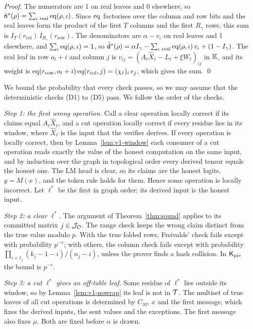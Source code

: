 \noindent\emph{Proof.} The numerators are 1 on real leaves and 0 elsewhere, so $\tilde{\mathsf
n}^\ast(\rho) = \sum_{\iota \text{ real}} \mathrm{eq}(\rho, \iota)$. Since $\mathrm{eq}$ factorises over the
column and row bits and the real leaves form the product of the first $T$ columns and the first
$R_\gamma$ rows, this sum is $I_T(r_{\mathrm{col}})\, I_{R_\gamma}(r_{\mathrm{row}})$. The
denominators are $\alpha - v_\iota$ on real leaves and 1 elsewhere, and $\sum_\iota \mathrm{eq}(\rho,
\iota) = 1$, so $\tilde{\mathsf d}^\ast(\rho) = \alpha I_\gamma - \sum_{\iota \text{ real}}
\mathrm{eq}(\rho, \iota)\, v_\iota + (1 - I_\gamma)$. The real leaf in row $o_\ell + i$ and column $j$ is
$v_{ij} = (A_\ell \hat X_\ell - L_\ell + \xi W_\ell)_{ij}$ in $\mathbb{K}$, and its weight is
$\mathrm{eq}(r_{\mathrm{row}}, o_\ell + i)\, \mathrm{eq}(r_{\mathrm{col}}, j) = (\chi_\ell)_i\, e_j$, which
gives the sum. \qed

 We bound the probability that every check passes, so we may
assume that the deterministic checks (D1) to (D5) pass. We follow the order of the checks.

\emph{Step 1: the first wrong operation.} Call a clear operation locally correct if its claims
equal $A_\ell \hat X_\ell$, and a cut operation locally correct if every residue lies in its
window, where $\hat X_\ell$ is the input that the verifier derives. If every operation is locally
correct, then by Lemma~\ref{lem:v1-window} each consumer of a cut operation reads exactly the value
of the honest computation on the same input, and by induction over the graph in topological order
every derived tensor equals the honest one. The LM head is clear, so its claims are the honest
logits, $y = M(x)$, and the token rule holds for them. Hence some operation is locally incorrect.
Let $\ell^\ast$ be the first in graph order; its derived input is the honest input.

\emph{Step 2: a clear $\ell^\ast$.} The argument of Theorem~\ref{thm:sound} applies to its
committed matrix $j \in \mathcal J_{\mathcal{O}}$. The range check keeps the wrong claim distinct from
the true value modulo $p$. With the true folded rows, Freivalds' check fails except with
probability $p^{-r}$; with others, the column check fails except with probability
$\prod_{i<t_j}(k_j - 1 - i)/(n_j - i)$, unless the prover finds a hash collision. In $\mathsf{K}_{\mathrm{pre}}$ the
bound is $p^{-r}$.

\emph{Step 3: a cut $\ell^\ast$ gives an off-table leaf.} Some residue of $\ell^\ast$ lies outside
its window, so by Lemma~\ref{lem:v1-nowrap} its leaf is not in $\mathcal{T}$. The multiset of true leaves
of all cut operations is determined by $C_M$, $x$ and the first message, which fixes the derived
inputs, the sent values and the exceptions. The first message also fixes $\mu$. Both are fixed
before $\alpha$ is drawn.

